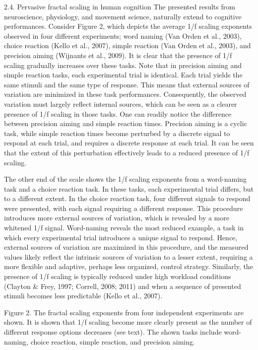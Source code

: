 \documentclass[12pt,]{book}
\begin{document}
2.4. Pervasive fractal scaling in human cognition
The presented results from neuroscience, physiology, and movement science, naturally extend to cognitive performances. Consider Figure 2, which depicts the average 1/f scaling exponents observed in four different experiments; word naming (Van Orden et al., 2003), choice reaction (Kello et al., 2007), simple reaction (Van Orden et al., 2003), and precision aiming (Wijnants et al., 2009). It is clear that the presence of 1/f scaling gradually increases over these tasks. Note that in precision aiming and simple reaction tasks, each experimental trial is identical. Each trial yields the same stimuli and the same type of response. This means that external sources of variation are minimized in these task performances. Consequently, the observed variation must largely reflect internal sources, which can be seen as a clearer presence of 1/f scaling in those tasks. One can readily notice the difference between precision aiming and simple reaction times. Precision aiming is a cyclic task, while simple reaction times become perturbed by a discrete signal to respond at each trial, and requires a discrete response at each trial. It can be seen that the extent of this perturbation effectively leads to a reduced presence of 1/f scaling.

The other end of the scale shows the 1/f scaling exponents from a word-naming task and a choice reaction task. In these tasks, each experimental trial differs, but to a different extent. In the choice reaction task, four different signals to respond were presented, with each signal requiring a different response. This procedure introduces more external sources of variation, which is revealed by a more whitened 1/f signal. Word-naming reveals the most reduced example, a task in which every experimental trial introduces a unique signal to respond. Hence, external sources of variation are maximized in this procedure, and the measured values likely reflect the intrinsic sources of variation to a lesser extent, requiring a more flexible and adaptive, perhaps less organized, control strategy. Similarly, the presence of 1/f scaling is typically reduced under high workload conditions (Clayton \& Frey, 1997; Correll, 2008; 2011) and when a sequence of presented stimuli becomes less predictable (Kello et al., 2007).

Figure 2. The fractal scaling exponents from four independent experiments are shown. It is shown that 1/f scaling become more clearly present as the number of different response options decreases (see text). The shown tasks include word-naming, choice reaction, simple reaction, and precision aiming.
\end{document}
